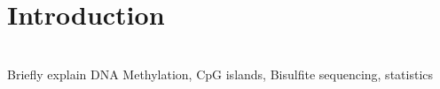 \section{Introduction}
\\
Briefly explain DNA Methylation, CpG islands, Bisulfite sequencing, statistics
  
  
  